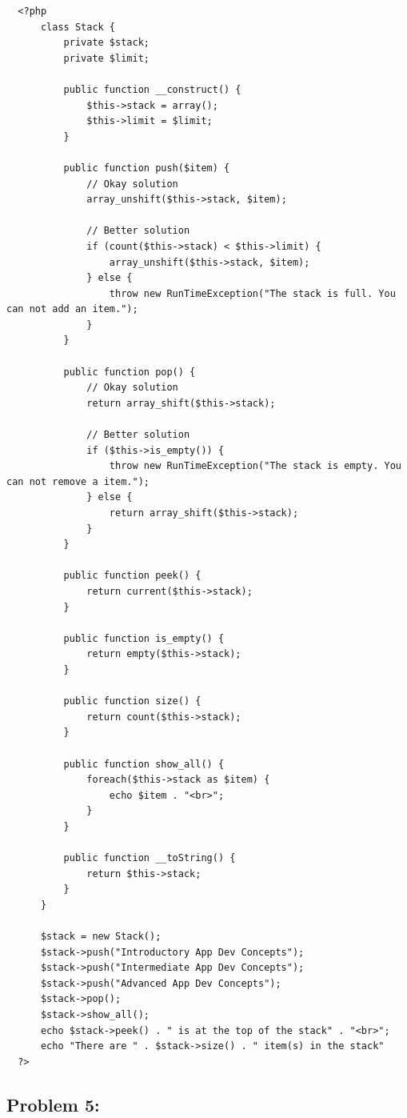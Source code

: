 \documentclass{article}
\begin{document}
\begin{verbatim}
  <?php
      class Stack {
          private $stack;
          private $limit;

          public function __construct() {
              $this->stack = array();
              $this->limit = $limit;
          }

          public function push($item) {
              // Okay solution
              array_unshift($this->stack, $item); 

              // Better solution
              if (count($this->stack) < $this->limit) {
                  array_unshift($this->stack, $item);
              } else {
                  throw new RunTimeException("The stack is full. You can not add an item.");
              }
          }

          public function pop() {
              // Okay solution
              return array_shift($this->stack);

              // Better solution
              if ($this->is_empty()) {
                  throw new RunTimeException("The stack is empty. You can not remove a item.");
              } else {
                  return array_shift($this->stack); 
              }
          }

          public function peek() {
              return current($this->stack);
          }

          public function is_empty() {
              return empty($this->stack);
          }

          public function size() {
              return count($this->stack);
          }

          public function show_all() {
              foreach($this->stack as $item) {
                  echo $item . "<br>";
              }
          }

          public function __toString() {
              return $this->stack;
          }
      }   
          
      $stack = new Stack();
      $stack->push("Introductory App Dev Concepts");
      $stack->push("Intermediate App Dev Concepts");
      $stack->push("Advanced App Dev Concepts");
      $stack->pop();
      $stack->show_all();
      echo $stack->peek() . " is at the top of the stack" . "<br>";
      echo "There are " . $stack->size() . " item(s) in the stack"
  ?>
\end{verbatim}

\subsection*{Problem 5:} 
\end{document}
